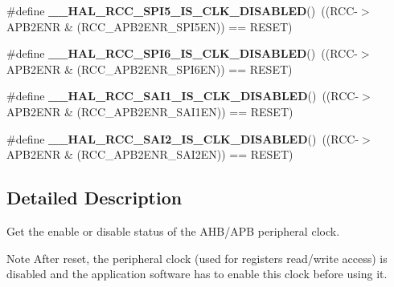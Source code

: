 \begin{DoxyCompactItemize}
\mbox{\label{group___r_c_c_ex___peripheral___clock___enable___disable___status_ga01d92a5d361dde16cf9b69e93d93f94c}} 
\#define {\bfseries \+\_\+\+\_\+\+H\+A\+L\+\_\+\+R\+C\+C\+\_\+\+S\+P\+I5\+\_\+\+I\+S\+\_\+\+C\+L\+K\+\_\+\+D\+I\+S\+A\+B\+L\+ED}()~((R\+CC-\/$>$A\+P\+B2\+E\+NR \& (R\+C\+C\+\_\+\+A\+P\+B2\+E\+N\+R\+\_\+\+S\+P\+I5\+EN)) == R\+E\+S\+ET)
\item 
\mbox{\label{group___r_c_c_ex___peripheral___clock___enable___disable___status_gaf1478d44aef81f3e94f06eb3790cb94c}} 
\#define {\bfseries \+\_\+\+\_\+\+H\+A\+L\+\_\+\+R\+C\+C\+\_\+\+S\+P\+I6\+\_\+\+I\+S\+\_\+\+C\+L\+K\+\_\+\+D\+I\+S\+A\+B\+L\+ED}()~((R\+CC-\/$>$A\+P\+B2\+E\+NR \& (R\+C\+C\+\_\+\+A\+P\+B2\+E\+N\+R\+\_\+\+S\+P\+I6\+EN)) == R\+E\+S\+ET)
\item 
\mbox{\label{group___r_c_c_ex___peripheral___clock___enable___disable___status_ga6ab9ff98419017940fdd2c608e2f4db0}} 
\#define {\bfseries \+\_\+\+\_\+\+H\+A\+L\+\_\+\+R\+C\+C\+\_\+\+S\+A\+I1\+\_\+\+I\+S\+\_\+\+C\+L\+K\+\_\+\+D\+I\+S\+A\+B\+L\+ED}()~((R\+CC-\/$>$A\+P\+B2\+E\+NR \& (R\+C\+C\+\_\+\+A\+P\+B2\+E\+N\+R\+\_\+\+S\+A\+I1\+EN)) == R\+E\+S\+ET)
\item 
\mbox{\label{group___r_c_c_ex___peripheral___clock___enable___disable___status_gac15c475c402488b4244e0cb18814708f}} 
\#define {\bfseries \+\_\+\+\_\+\+H\+A\+L\+\_\+\+R\+C\+C\+\_\+\+S\+A\+I2\+\_\+\+I\+S\+\_\+\+C\+L\+K\+\_\+\+D\+I\+S\+A\+B\+L\+ED}()~((R\+CC-\/$>$A\+P\+B2\+E\+NR \& (R\+C\+C\+\_\+\+A\+P\+B2\+E\+N\+R\+\_\+\+S\+A\+I2\+EN)) == R\+E\+S\+ET)
\end{DoxyCompactItemize}


\subsection{Detailed Description}
Get the enable or disable status of the A\+H\+B/\+A\+PB peripheral clock. 

\begin{DoxyNote}{Note}
After reset, the peripheral clock (used for registers read/write access) is disabled and the application software has to enable this clock before using it. 
\end{DoxyNote}


